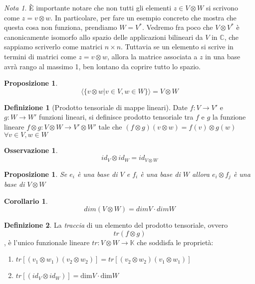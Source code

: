 \documentclass[11pt]{article}
\theoremstyle{plain}
\newtheorem{prop}[thm]{Proposizione}
\newtheorem*{cor}{Corollario}
\theoremstyle{definition}
\newtheorem{defn}{Definizione}[section]
\newtheorem*{rem}{Osservazione}
\theoremstyle{remark}
\newtheorem*{note}{Nota}
\newcommand{\C}{\mathbb{C}}
\newcommand{\K}{\mathbb{K}}
\begin{document}
\begin{note}
\`E importante notare che non tutti gli elementi $z \in V \otimes W$ si scrivono come $z = v \otimes w$. In particolare, per fare un esempio concreto che mostra che questa cosa non funziona, prendiamo $W = V^*$. Vedremo fra poco che $V\otimes V^*$ è canonicamente isomorfo allo spazio delle applicazioni bilineari da $V$ in $\C$, che sappiamo scriverlo come matrici $n\times n$. Tuttavia se un elemento si scrive in termini di matrici come $z = v\otimes w$, allora la matrice associata a $z$ in una base avrà rango al massimo 1, ben lontano da coprire tutto lo spazio.
\end{note}


\begin{prop}
\[\langle\{ v \otimes w | v \in V, w \in W\} \rangle  = V \otimes W\]

\end{prop}


\begin{defn}[Prodotto tensoriale di mappe lineari]
Date $f:V \to V'$ e $g:W \to W'$ funzioni lineari, si definisce prodotto tensoriale tra $f$ e $g$ la funzione lineare $f \otimes g : V \otimes W \to V' \otimes W'$ tale che $(f \otimes g)(v \otimes w)=f(v) \otimes g(w)$ $\forall v\in V, w\in W$

\end{defn}

\begin{rem}

\[ id_V \otimes id_W = id_{V\otimes W}\]
\end{rem}




\begin{prop}

Se $e_i$ è una base di $V$ e $f_i$ è una base di $W$ allora $e_i \otimes f_j$ è una base di $V \otimes W$
\end{prop}


\begin{cor}
\[dim(V \otimes W) = dim V \cdot dim W \]

\end{cor}

















\begin{defn}
La \emph{traccia} di un elemento del prodotto tensoriale, ovvero 
\[ tr(f\otimes g)\], 
è l'unico funzionale lineare $tr: V \otimes W \to \K$ che soddisfa le proprietà:
\begin{enumerate}
\item $tr[ (v_1 \otimes w_1) (v_2 \otimes w_2) ] = tr[ (v_2 \otimes w_2) (v_1 \otimes w_1) ] $ 
\item $tr[ (id_V \otimes id_W)  ]  = \mbox{dim} V \cdot \mbox{dim} W $
\end{enumerate}
\end{defn}
\end{document}
